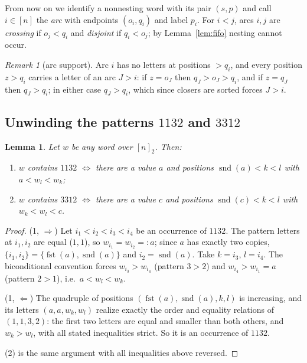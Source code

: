 \documentclass[11pt]{article}
\newtheorem{lemma}[theorem]{Lemma}
\theoremstyle{definition}
\theoremstyle{remark}
\newtheorem{remark}[theorem]{Remark}
\newcommand{\nn}{[n]_2}
\DeclareMathOperator{\fst}{fst}
\DeclareMathOperator{\snd}{snd}
\begin{document}
From now on we identify a nonnesting word with its pair $(s,p)$ and call
$i\in[n]$ the \emph{arc} with endpoints $(o_i,q_i)$ and label $p_i$. For
$i<j$, arcs $i,j$ are \emph{crossing} if $o_j<q_i$ and \emph{disjoint} if
$q_i<o_j$; by Lemma~\ref{lem:fifo} nesting cannot occur.

\begin{remark}[arc support]\label{rem:support}
Arc $i$ has no letters at positions $>q_i$, and every position $z>q_i$
carries a letter of an arc $J>i$: if $z=o_J$ then $q_J>o_J>q_i$, and if
$z=q_J$ then $q_J>q_i$; in either case $q_J>q_i$, which since closers are
sorted forces $J>i$.
\end{remark}

\subsection{Unwinding the patterns \texorpdfstring{$1132$ and $3312$}{1132 and 3312}}

\begin{lemma}\label{lem:positional}
Let $w$ be any word over $\nn$. Then:
\begin{enumerate}
\item $w$ contains $1132$ $\iff$ there are a value $a$ and positions
  $\snd(a)<k<l$ with $a<w_l<w_k$;
\item $w$ contains $3312$ $\iff$ there are a value $c$ and positions
  $\snd(c)<k<l$ with $w_k<w_l<c$.
\end{enumerate}
\end{lemma}

\begin{proof}
(1, $\Rightarrow$) Let $i_1<i_2<i_3<i_4$ be an occurrence of $1132$. The
pattern letters at $i_1,i_2$ are equal ($1,1$), so $w_{i_1}=w_{i_2}=:a$;
since $a$ has exactly two copies, $\{i_1,i_2\}=\{\fst(a),\snd(a)\}$ and
$i_2=\snd(a)$. Take $k=i_3$, $l=i_4$. The biconditional convention forces
$w_{i_3}>w_{i_4}$ (pattern $3>2$) and $w_{i_4}>w_{i_1}=a$ (pattern $2>1$),
i.e.\ $a<w_l<w_k$.

(1, $\Leftarrow$) The quadruple of positions
$(\fst(a),\snd(a),k,l)$ is increasing, and its letters $(a,a,w_k,w_l)$
realize exactly the order and equality relations of $(1,1,3,2)$: the first
two letters are equal and smaller than both others, and $w_k>w_l$, with all
stated inequalities strict. So it is an occurrence of $1132$.

(2) is the same argument with all inequalities above reversed.
\end{proof}
\end{document}
